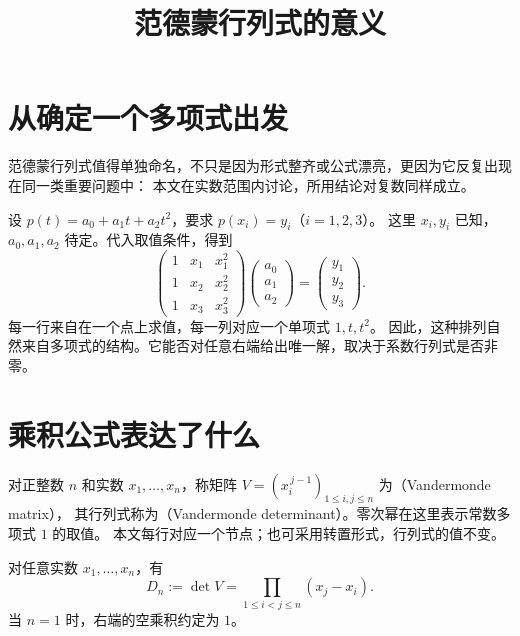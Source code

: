 \documentclass[UTF8,12pt,a4paper,fontset=fandol]{ctexart}
\title{范德蒙行列式的意义}
\author{}
\date{}
\begin{document}
\maketitle

\section{从确定一个多项式出发}

范德蒙行列式值得单独命名，不只是因为形式整齐或公式漂亮，更因为它反复出现在同一类重要问题中：
本文在实数范围内讨论，所用结论对复数同样成立。

设 $p(t)=a_0+a_1t+a_2t^2$，要求 $p(x_i)=y_i$（$i=1,2,3$）。
这里 $x_i,y_i$ 已知，$a_0,a_1,a_2$ 待定。代入取值条件，得到
\[
  \begin{pmatrix}
    1&x_1&x_1^2\\
    1&x_2&x_2^2\\
    1&x_3&x_3^2
  \end{pmatrix}
  \begin{pmatrix}a_0\\a_1\\a_2\end{pmatrix}
  =\begin{pmatrix}y_1\\y_2\\y_3\end{pmatrix}.
\]
每一行来自在一个点上求值，每一列对应一个单项式 $1,t,t^2$。
因此，这种排列自然来自多项式的结构。它能否对任意右端给出唯一解，取决于系数行列式是否非零。

\section{乘积公式表达了什么}

对正整数 $n$ 和实数 $x_1,\ldots,x_n$，称矩阵
$V=(x_i^{\,j-1})_{1\leq i,j\leq n}$ 为（Vandermonde matrix），
其行列式称为（Vandermonde determinant）。零次幂在这里表示常数多项式 $1$ 的取值。
本文每行对应一个节点；也可采用转置形式，行列式的值不变。

\begin{theorem}[范德蒙行列式公式]
\label{thm:meaning-product}
对任意实数 $x_1,\ldots,x_n$，有
\begin{equation}
  D_n:=\det V=\prod_{1\leq i<j\leq n}(x_j-x_i).
  \label{eq:meaning-product}
\end{equation}
当 $n=1$ 时，右端的空乘积约定为 $1$。
\end{theorem}
\end{document}
